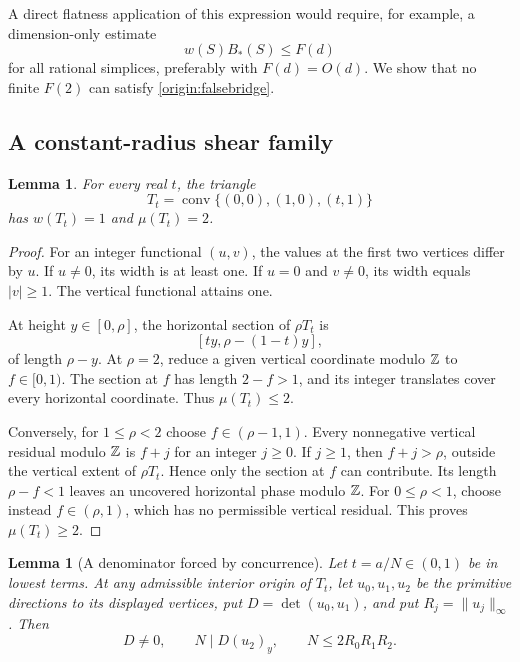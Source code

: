\documentclass[11pt,a4paper]{article}
\newtheorem{lemma}[theorem]{Lemma}
\theoremstyle{remark}\newtheorem{remark}[theorem]{Remark}
\DeclareMathOperator{\conv}{conv}
\newcommand{\Bopt}{B_*}
\begin{document}
A direct flatness application of this expression would require,
for example, a dimension-only estimate
\begin{equation}\label{origin:falsebridge}
 w(S)\Bopt(S)\le F(d)
\end{equation}
for all rational simplices, preferably with $F(d)=O(d)$.
We show that no finite $F(2)$ can satisfy \eqref{origin:falsebridge}.

\subsection{A constant-radius shear family}

\begin{lemma}\label{origin:shear}
For every real $t$, the triangle
\[
 T_t=\conv\{(0,0),(1,0),(t,1)\}
\]
has $w(T_t)=1$ and $\mu(T_t)=2$.
\end{lemma}

\begin{proof}
For an integer functional $(u,v)$, the values at the first two
vertices differ by $u$. If $u\ne0$, its width is at least one.
If $u=0$ and $v\ne0$, its width equals $|v|\ge1$.
The vertical functional attains one.

At height $y\in[0,\rho]$, the horizontal section of $\rho T_t$ is
\begin{equation}\label{origin:section}
 [ty,\rho-(1-t)y],
\end{equation}
of length $\rho-y$. At $\rho=2$, reduce a given vertical
coordinate modulo $\mathbb Z$ to $f\in[0,1)$. The section at $f$ has
length $2-f>1$, and its integer translates cover every horizontal
coordinate. Thus $\mu(T_t)\le2$.

Conversely, for $1\le\rho<2$ choose $f\in(\rho-1,1)$.
Every nonnegative vertical residual modulo $\mathbb Z$ is $f+j$ for an
integer $j\ge0$. If $j\ge1$, then $f+j>\rho$, outside the
vertical extent of $\rho T_t$. Hence only the section at $f$ can
contribute. Its length $\rho-f<1$ leaves an uncovered horizontal
phase modulo $\mathbb Z$. For $0\le\rho<1$, choose instead
$f\in(\rho,1)$, which has no permissible vertical residual.
This proves $\mu(T_t)\ge2$.
\end{proof}

\begin{lemma}[A denominator forced by concurrence]\label{origin:denominator}
Let $t=a/N\in(0,1)$ be in lowest terms. At any admissible
interior origin of $T_t$, let $u_0,u_1,u_2$ be the primitive
directions to its displayed vertices, put
$D=\det(u_0,u_1)$, and put $R_j=\|u_j\|_\infty$.
Then
\begin{equation}\label{origin:divisibility}
 D\ne0,\qquad N\mid D(u_2)_y,
 \qquad N\le2R_0R_1R_2.
\end{equation}
\end{lemma}
\end{document}
